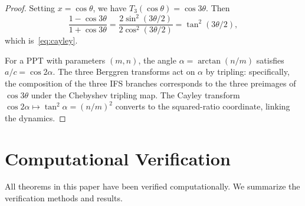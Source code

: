 \documentclass[12pt]{amsart}
\theoremstyle{definition}
\theoremstyle{remark}
\begin{document}
\begin{proof}
Setting $x = \cos\theta$, we have $T_3(\cos\theta) = \cos 3\theta$.
Then
\[
\frac{1 - \cos 3\theta}{1 + \cos 3\theta}
= \frac{2\sin^2(3\theta/2)}{2\cos^2(3\theta/2)}
= \tan^2(3\theta/2),
\]
which is~\eqref{eq:cayley}.

For a PPT with parameters $(m,n)$, the angle $\alpha = \arctan(n/m)$
satisfies $a/c = \cos 2\alpha$.  The three Berggren transforms act
on $\alpha$ by tripling: specifically, the composition of the three
IFS branches corresponds to the three preimages of $\cos 3\theta$
under the Chebyshev tripling map.  The Cayley transform
$\cos 2\alpha \mapsto \tan^2\alpha = (n/m)^2$ converts to the
squared-ratio coordinate, linking the dynamics.
\end{proof}


\section{Computational Verification}\label{sec:computation}

All theorems in this paper have been verified computationally.  We
summarize the verification methods and results.
\end{document}

